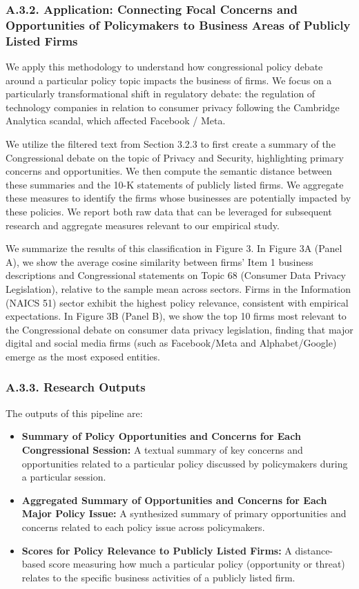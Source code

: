 \documentclass[11pt]{article}
\begin{document}
\subsubsection*{A.3.2. Application: Connecting Focal Concerns and Opportunities of Policymakers to Business Areas of Publicly Listed Firms}

We apply this methodology to understand how congressional policy debate around a particular policy topic impacts the business of firms. We focus on a particularly transformational shift in regulatory debate: the regulation of technology companies in relation to consumer privacy following the Cambridge Analytica scandal, which affected Facebook / Meta.

We utilize the filtered text from Section 3.2.3 to first create a summary of the Congressional debate on the topic of Privacy and Security, highlighting primary concerns and opportunities. We then compute the semantic distance between these summaries and the 10-K statements of publicly listed firms. We aggregate these measures to identify the firms whose businesses are potentially impacted by these policies. We report both raw data that can be leveraged for subsequent research and aggregate measures relevant to our empirical study.

We summarize the results of this classification in Figure 3. In Figure 3A (Panel A), we show the average cosine similarity between firms' Item 1 business descriptions and Congressional statements on Topic 68 (Consumer Data Privacy Legislation), relative to the sample mean across sectors. Firms in the Information (NAICS 51) sector exhibit the highest policy relevance, consistent with empirical expectations. In Figure 3B (Panel B), we show the top 10 firms most relevant to the Congressional debate on consumer data privacy legislation, finding that major digital and social media firms (such as Facebook/Meta and Alphabet/Google) emerge as the most exposed entities.

\subsubsection*{A.3.3. Research Outputs}

The outputs of this pipeline are:

\begin{itemize}
    \item \textbf{Summary of Policy Opportunities and Concerns for Each Congressional Session:} A textual summary of key concerns and opportunities related to a particular policy discussed by policymakers during a particular session.
    \item \textbf{Aggregated Summary of Opportunities and Concerns for Each Major Policy Issue:} A synthesized summary of primary opportunities and concerns related to each policy issue across policymakers.
    \item \textbf{Scores for Policy Relevance to Publicly Listed Firms:} A distance-based score measuring how much a particular policy (opportunity or threat) relates to the specific business activities of a publicly listed firm.
\end{itemize}
\end{document}
